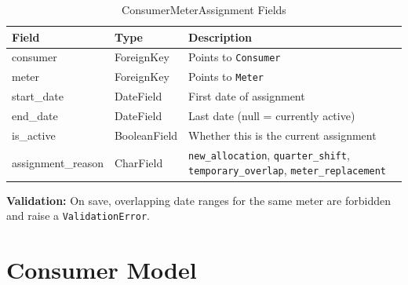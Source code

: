 \documentclass[12pt, a4paper]{report}
\begin{document}
\begin{table}[H]
\centering
\caption{ConsumerMeterAssignment Fields}
\begin{tabularx}{\textwidth}{>{\ttfamily}l l X}
\toprule
\textbf{Field} & \textbf{Type} & \textbf{Description} \\
\midrule
consumer & ForeignKey & Points to \texttt{Consumer} \\
meter & ForeignKey & Points to \texttt{Meter} \\
start\_date & DateField & First date of assignment \\
end\_date & DateField & Last date (null = currently active) \\
is\_active & BooleanField & Whether this is the current assignment \\
assignment\_reason & CharField & \texttt{new\_allocation}, \texttt{quarter\_shift}, \texttt{temporary\_overlap}, \texttt{meter\_replacement} \\
\bottomrule
\end{tabularx}
\end{table}

\textbf{Validation:} On save, overlapping date ranges for the same meter are forbidden and raise a \texttt{ValidationError}.

\section{Consumer Model}
\end{document}
